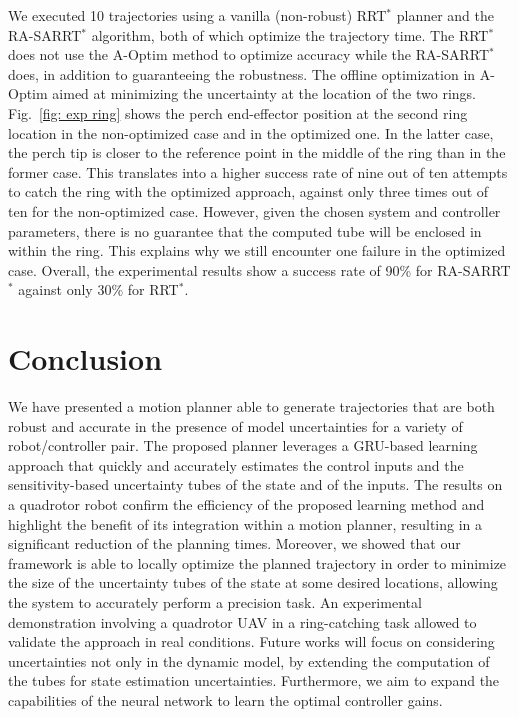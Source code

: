 We executed 10 trajectories using a vanilla (non-robust) RRT$^*$ planner and the RA-SARRT$^*$ algorithm, both of which optimize the trajectory time.
The RRT$^*$ does not use the A-Optim method to optimize accuracy while the RA-SARRT$^*$ does, in addition to guaranteeing the robustness.
The offline optimization in A-Optim aimed at minimizing the uncertainty at the location of the two rings.
Fig.~\ref{fig: exp ring} shows the perch end-effector position at the second ring location in the non-optimized case and in the optimized one. 
In the latter case, the perch tip is closer to the reference point in the middle of the ring than in the former case. This translates into a higher success rate of nine out of ten attempts to catch the ring with the optimized approach, against only three times out of ten for the non-optimized case.
However, given the chosen system and controller parameters, there is no guarantee that the computed tube will be enclosed in within the ring.
This explains why we still encounter one failure in the optimized case.
Overall, the experimental results show a success rate of 90\% for RA-SARRT$^*$ against only 30\% for RRT$^*$.

\section{Conclusion} \label{sec:Conclusion}

We have presented a motion planner able to generate trajectories that are both robust and accurate in the presence of model uncertainties for a variety of robot/controller pair. The proposed planner leverages a GRU-based learning approach that quickly and accurately estimates the control inputs and the sensitivity-based uncertainty tubes of the state and of the inputs. 
The results on a quadrotor robot confirm the efficiency of the proposed learning method and highlight the benefit of its integration within a motion planner, resulting in a significant reduction of the planning times. 
Moreover, we showed that our framework is able to locally optimize the planned trajectory in order to minimize the size of the uncertainty tubes of the state at some desired locations, allowing the system to accurately perform a precision task. An experimental demonstration involving a quadrotor UAV in a ring-catching task allowed to validate the approach in real conditions. Future works will focus on considering uncertainties not only in the dynamic model, by extending the computation of the tubes for state estimation uncertainties. 
Furthermore, we aim to expand the capabilities of the neural network to learn the optimal controller gains.
